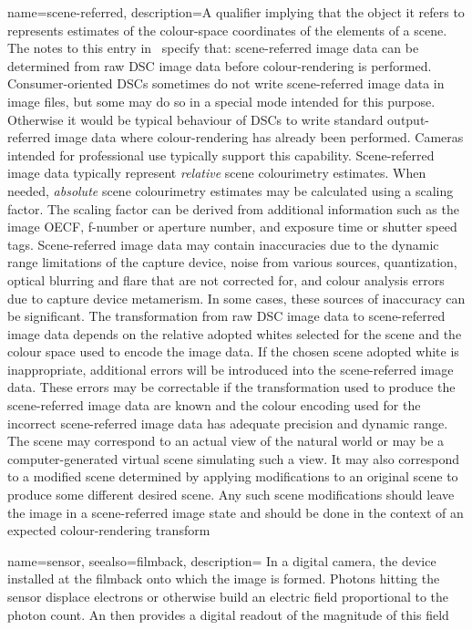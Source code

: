 {
	name={scene-referred},
	description={A qualifier implying that the object it refers to represents estimates of the colour-space 
		coordinates of the elements of a scene. 
		The notes to this entry in~\cite{iso:22028-1:2016} specify that:
		scene-referred image data can be determined from raw \gls{DSC} image data before colour-rendering is performed. Consumer-oriented \glspl{DSC} sometimes do not write scene-referred image data in image files, but some may do so in a special mode intended for this purpose. Otherwise it would be typical behaviour of \glspl{DSC} to write standard output-referred image data where colour-rendering has already been performed. Cameras intended
		for professional use typically support this capability.
		Scene-referred image data typically represent \emph{relative} scene colourimetry estimates. 
		When needed, \emph{absolute} scene colourimetry estimates may be calculated using a scaling factor. 
		The scaling factor can be derived from additional information such as the image \gls{OECF}, 
		\gls{f-number} or \gls{aperture number}, and \gls{exposure time} or \gls{shutter speed} tags.
		Scene-referred image data may contain inaccuracies due to the dynamic range limitations of the capture device, noise from various sources, quantization, optical blurring and flare that are not corrected for, and colour analysis errors due to capture device metamerism. In some cases, these sources of inaccuracy can be significant.
		The transformation from raw \gls{DSC} image data to scene-referred image data depends on the relative adopted whites selected for the scene and the colour space used to encode the image data. If the chosen scene adopted white is inappropriate, additional errors will be introduced into the scene-referred image data. These errors may be correctable if the transformation used to produce the scene-referred image data are known and the colour encoding used for the incorrect scene-referred image data has adequate precision and dynamic range.
		The scene may correspond to an actual view of the natural world or may be a computer-generated \gls{virtual} scene simulating such a view. It may also correspond to a modified scene determined by applying modifications to an original scene to produce some different desired scene. Any such scene modifications should leave the image in a scene-referred image state and should be done in the context of an expected colour-rendering transform}
}

{
	name=sensor,
	seealso={filmback},
	description={
		In a digital camera, the device installed at the filmback onto which the image is 
		formed. Photons hitting the sensor displace electrons or otherwise build an electric
		field proportional to the photon count. An  then provides a 
		digital readout of the magnitude of this field}
}

